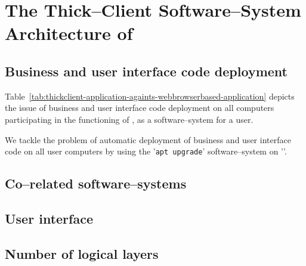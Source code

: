 \chapter{The Thick--Client Software--System Architecture of \yerotherpblack}


\section{Business and user interface code deployment}

Table~\ref{tab:thickclient-application-againts-webbrowserbased-application}
depicts the issue of business and user
interface code deployment on all computers
participating in the functioning of \yerotherpblack,
as a software--system for a user.

We tackle the problem of automatic deployment of
business and user interface code on all user
computers by using the '\texttt{apt upgrade}'
software--system on '\debianlinux'.

\section{Co--related software--systems}


\section{User interface}


\section{Number of logical layers}
